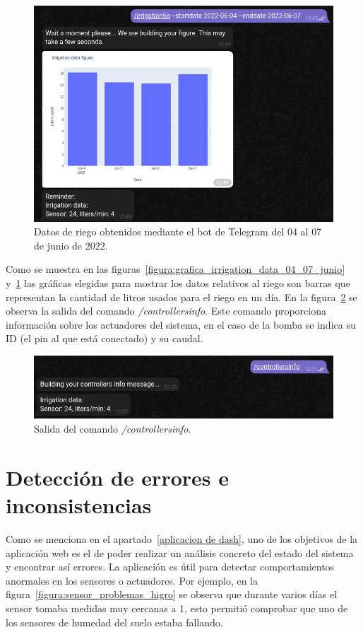 \documentclass[a4paper, 12pt, oneside]{book}
\begin{document}
\begin{figure}[H]
	\centering
    \includegraphics[width=12cm, keepaspectratio]{img/irrigationfig_04_07_junio}
    \caption{Datos de riego obtenidos mediante el bot de Telegram del 04 al 07 de junio de 2022.}
    \label{figura:irrigationfig_04_07_junio}
\end{figure}

Como se muestra en las figuras~\ref{figura:grafica_irrigation_data_04_07_junio} y~\ref{figura:irrigationfig_04_07_junio} las gráficas elegidas para mostrar los datos relativos al riego son barras que representan la cantidad de litros usados para el riego en un día. En la figura~\ref{figura:comando controllers info} se observa la salida del comando \textit{/controllersinfo}. Este comando proporciona información sobre los actuadores del sistema, en el caso de la bomba se indica su ID (el pin al que está conectado) y su caudal.

\begin{figure}[H]
	\centering
    \includegraphics[width=12cm, keepaspectratio]{img/controllers_info}
    \caption{Salida del comando \textit{/controllersinfo}.}
    \label{figura:comando controllers info}
\end{figure}


\section{Detección de errores e inconsistencias}
\label{sec:detección de errorese inconsistencias}
Como se menciona en el apartado~\ref{aplicacion de dash}, uno de los objetivos de la aplicación web es el de poder realizar un análisis concreto del estado del sistema y encontrar así errores.
La aplicación es útil para detectar comportamientos anormales en los sensores o actuadores. Por ejemplo, en la figura~\ref{figura:sensor_problemas_higro} se observa que durante varios días el sensor tomaba medidas muy cercanas a 1, esto permitió comprobar que uno de los sensores de humedad del suelo estaba fallando.
\end{document}
